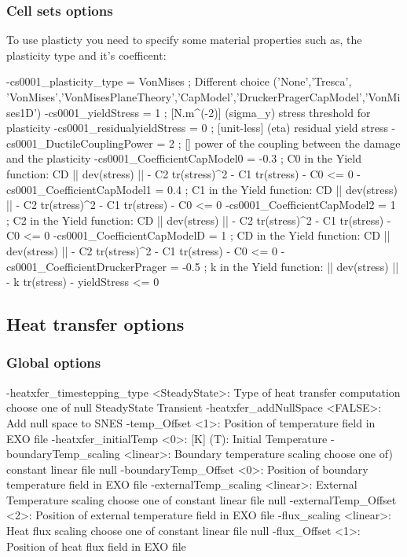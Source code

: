 \documentclass[10pt,oneside]{memoir}
\begin{document}
\subsubsection{Cell sets options}
To use plasticty you need to specify some material properties such as, the plasticity type and it's coefficent:
\begin{boxedverbatim}
-cs0001_plasticity_type = VonMises ; Different choice ('None','Tresca',
'VonMises','VonMisesPlaneTheory','CapModel','DruckerPragerCapModel','VonMises1D')
-cs0001_yieldStress = 1 ; [N.m^(-2)] (sigma_y) stress threshold for plasticity
-cs0001_residualyieldStress = 0 ; [unit-less] (eta) residual yield stress
-cs0001_DuctileCouplingPower = 2 ; [] power of the coupling between the 
damage and the plasticity
-cs0001_CoefficientCapModel0 = -0.3 ; C0 in the Yield function: CD 
|| dev(stress) || - C2 tr(stress)^2 - C1 tr(stress) - C0 <= 0
-cs0001_CoefficientCapModel1 = 0.4 ; C1 in the Yield function: CD 
|| dev(stress) || - C2 tr(stress)^2 - C1 tr(stress) - C0 <= 0
-cs0001_CoefficientCapModel2 = 1 ; C2 in the Yield function: CD 
|| dev(stress) || - C2 tr(stress)^2 - C1 tr(stress) - C0 <= 0
-cs0001_CoefficientCapModelD = 1 ; CD in the Yield function: CD 
|| dev(stress) || - C2 tr(stress)^2 - C1 tr(stress) - C0 <= 0
-cs0001_CoefficientDruckerPrager = -0.5 ; k in the Yield function: 
|| dev(stress) || - k tr(stress) - yieldStress <= 0
\end{boxedverbatim}


\subsection{Heat transfer options}
\subsubsection{Global options}
\small{\begin{boxedverbatim}
-heatxfer_timestepping_type <SteadyState>:   Type of heat transfer computation 
                                choose one of null SteadyState Transient
-heatxfer_addNullSpace <FALSE>: Add null space to SNES 
-temp_Offset <1>:               Position of temperature field in EXO file 
-heatxfer_initialTemp <0>:      [K] (T): Initial Temperature 
-boundaryTemp_scaling <linear>: Boundary temperature scaling 
                                choose one of)  constant linear file null
-boundaryTemp_Offset <0>:       Position of boundary temperature field in EXO file 
-externalTemp_scaling <linear>: External Temperature scaling 
                                choose one of constant linear file null
-externalTemp_Offset <2>:       Position of external temperature field in EXO file 
-flux_scaling <linear>:         Heat flux scaling 
                                choose one of constant linear file null
-flux_Offset <1>:               Position of heat flux field in EXO file 
\end{boxedverbatim}}
\end{document}

